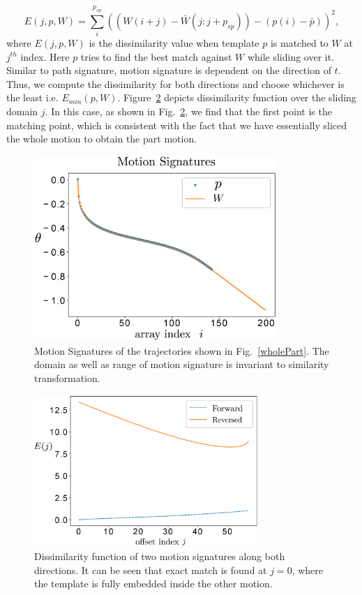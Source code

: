 \documentclass[twocolumn,10pt]{asme2ej}
\begin{document}
\begin{equation}\label{mccEq}
  E(j, p, W) = \sum_{i}^{p_{sp}} {((W(i+j) - \bar{W}(j: j + p_{sp})) - (p(i) - \bar{p}))}^2,
\end{equation}
where $E(j, p, W)$ is the dissimilarity value when template $p$ is matched to $W$ at $j^{th}$ index. Here $p$ tries to find the best match against $W$ while sliding over it.
Similar to path signature, motion signature is dependent on the direction of $t$. Thus, we compute the dissimilarity for both directions and choose whichever is the least i.e. $E_{min}(p, W)$.
Figure~\ref{mcc} depicts dissimilarity function over the sliding domain $j$.
In this case, as shown in Fig.~\ref{mcc}, we find that the first point is the matching point, which is consistent with the fact that we have essentially sliced the whole motion to obtain the part motion.

\begin{figure}
\centering
\includegraphics[width=260pt]{figure/fig_motion_signatures.eps}
  \caption{Motion Signatures of the trajectories shown in Fig.~\ref{wholePart}. The domain as well as range of motion signature is invariant to similarity transformation.}
\label{motionSignature}
\end{figure}

\begin{figure}
\centering
\includegraphics[width=240pt]{figure/fig_mcc.eps}
  \caption{Dissimilarity function of two motion signatures along both directions. It can be seen that exact match is found at $j=0$, where the template is fully embedded inside the other motion.}
\label{mcc}
\end{figure}
\end{document}
